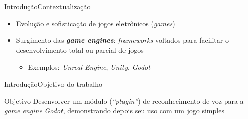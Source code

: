 \begin{frame}{Introdução}{Contextualização}

\begin{itemize}
\item Evolução e sofisticação de jogos eletrônicos (\textit{games})

\item Surgimento das \textbf{\emph{game engines}}: \textit{frameworks} voltados para facilitar o desenvolvimento total ou parcial de jogos

\begin{itemize}
  \item Exemplos: \textit{Unreal Engine}, \textit{Unity}, \textit{Godot}
\end{itemize}


\vspace{0.5cm}


\end{itemize}
\end{frame}


\begin{frame}{Introdução}{Objetivo do trabalho}

\begin{block}{Objetivo}
Desenvolver um módulo (\textit{``plugin''}) de reconhecimento de voz para a \textit{game engine} \textit{Godot}, demonstrando depois seu uso com um jogo simples
\end{block}

\vspace{0.5cm}


\end{frame}
